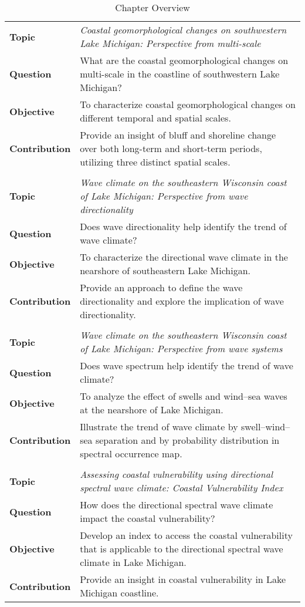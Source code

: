 \renewcommand{\arraystretch}{1.4}

\begin{longtable}{|>{\raggedright\arraybackslash}p{2.4cm}|p{12cm}|}
\caption{Chapter Overview} \\
\hline
\multicolumn{2}{|c|}{\textbf{Chapter 2}} \\
\hline
\textbf{Topic} & \textit{Coastal geomorphological changes on southwestern Lake Michigan: Perspective from multi-scale} \\
\textbf{Question} & What are the coastal geomorphological changes on multi-scale in the coastline of southwestern Lake Michigan? \\
\textbf{Objective} & To characterize coastal geomorphological changes on different temporal and spatial scales. \\
\textbf{Contribution} & Provide an insight of bluff and shoreline change over both long-term and short-term periods, utilizing three distinct spatial scales. \\
\hline
\multicolumn{2}{|c|}{\textbf{Chapter 3}} \\
\hline
\textbf{Topic} & \textit{Wave climate on the southeastern Wisconsin coast of Lake Michigan: Perspective from wave directionality} \\
\textbf{Question} & Does wave directionality help identify the trend of wave climate? \\
\textbf{Objective} & To characterize the directional wave climate in the nearshore of southeastern Lake Michigan. \\
\textbf{Contribution} & Provide an approach to define the wave directionality and explore the implication of wave directionality. \\
\hline
\multicolumn{2}{|c|}{\textbf{Chapter 4}} \\
\hline
\textbf{Topic} & \textit{Wave climate on the southeastern Wisconsin coast of Lake Michigan: Perspective from wave systems} \\
\textbf{Question} & Does wave spectrum help identify the trend of wave climate? \\
\textbf{Objective} & To analyze the effect of swells and wind–sea waves at the nearshore of Lake Michigan. \\
\textbf{Contribution} & Illustrate the trend of wave climate by swell–wind–sea separation and by probability distribution in spectral occurrence map. \\
\hline
\multicolumn{2}{|c|}{\textbf{Chapter 5}} \\
\hline
\textbf{Topic} & \textit{Assessing coastal vulnerability using directional spectral wave climate: Coastal Vulnerability Index} \\
\textbf{Question} & How does the directional spectral wave climate impact the coastal vulnerability? \\
\textbf{Objective} & Develop an index to access the coastal vulnerability that is applicable to the directional spectral wave climate in Lake Michigan. \\
\textbf{Contribution} & Provide an insight in coastal vulnerability in Lake Michigan coastline. \\
\hline
\end{longtable}
